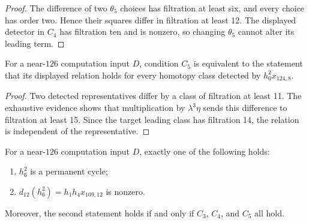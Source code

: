\begin{proof}
  The difference of two $\theta_5$ choices has filtration at least six, and
  every choice has order two.  Hence their squares differ in filtration at
  least 12.  The displayed detector in $C_4$ has filtration ten and is nonzero,
  so changing $\theta_5$ cannot alter its leading term.
\end{proof}

\begin{lemma}
  \label{lem:near126-equiv-c5}
  \notready
  For a near-$126$ computation input $D$, condition $C_5$ is equivalent to the
  statement that its displayed relation holds for every homotopy class
  detected by $h_0^2x_{124,8}$.
\end{lemma}

\begin{proof}
  Two detected representatives differ by a class of filtration at least 11.
  The exhaustive evidence shows that multiplication by $\lambda^3\eta$ sends
  this difference to filtration at least 15.  Since the target leading class
  has filtration 14, the relation is independent of the representative.
\end{proof}

\begin{proposition}
  \label{prop:possible-h62}
  \notready
  For a near-$126$ computation input $D$, exactly one of the following holds:
  \begin{enumerate}
    \item $h_6^2$ is a permanent cycle;
    \item $d_{12}(h_6^2)=h_1h_4x_{109,12}$ is nonzero.
  \end{enumerate}
  Moreover, the second statement holds if and only if
  $C_3$, $C_4$, and $C_5$ all hold.
\end{proposition}

